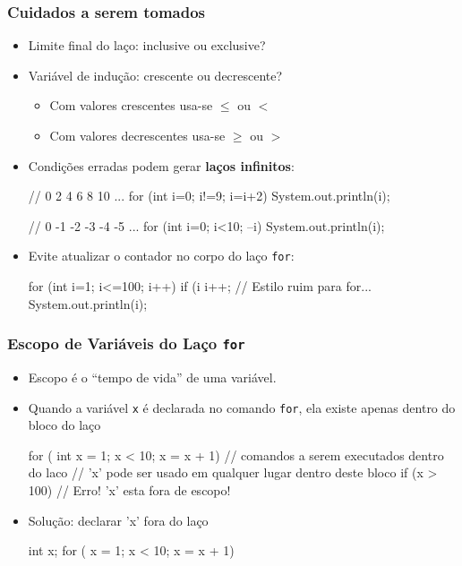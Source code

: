 \documentclass[xcolor={dvipsnames,table},aspectratio=169]{beamer}
\begin{document}
\begin{frame}[fragile]\frametitle{Cuidados a serem tomados}
\begin{itemize}
    \item Limite final do laço: inclusive ou exclusive?
    \item Variável de indução: crescente ou decrescente?
    \begin{itemize}
        \item Com valores crescentes usa-se $\le$ ou $<$
        \item Com valores decrescentes usa-se $\ge$ ou $>$
    \end{itemize}
    \item Condições erradas podem gerar \textbf{laços infinitos}:
{\scriptsize
\begin{javacode}
// 0 2 4 6 8 10 ...
for (int i=0; i!=9; i=i+2) System.out.println(i);

// 0 -1 -2 -3 -4 -5 ...
for (int i=0; i<10; --i) System.out.println(i);
\end{javacode}
}
	\item Evite atualizar o contador no corpo do laço \texttt{for}:
{\scriptsize
\begin{javacode}
for (int i=1; i<=100; i++) {
   if (i %
      i++;                // Estilo ruim para for...
   System.out.println(i);
}
\end{javacode}
}
\end{itemize}
\end{frame}

\begin{frame}[fragile]\frametitle{Escopo de Variáveis do Laço \texttt{for}}
\begin{itemize}
	\item Escopo é o ``tempo de vida'' de uma variável.
	\item Quando a variável \texttt{x} é declarada no comando \texttt{for}, ela existe apenas dentro do bloco do laço
\begin{javacode}
for ( int x = 1; x < 10; x = x + 1) {
   // comandos a serem executados dentro do laco
   // 'x' pode ser usado em qualquer lugar dentro deste bloco
}
if (x > 100)   // Erro! 'x' esta fora de escopo!
\end{javacode}
	\item Solução: declarar 'x' fora do laço
\begin{javacode}
int x;
for ( x = 1; x < 10; x = x + 1) {}
\end{javacode}
\end{itemize}
\end{frame}
\end{document}
